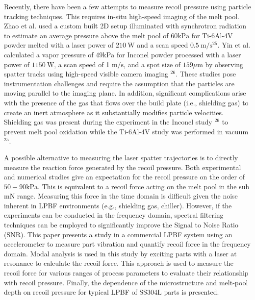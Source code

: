 \documentclass[10pt]{article}
\begin{document}
Recently, there have been a few attempts to measure recoil pressure using particle tracking techniques. This requires in-situ high-speed imaging of the melt pool. Zhao et al. used a custom built 2D setup illuminated with synchrotron radiation to estimate an average pressure above the melt pool of $60 \mathrm{kPa}$ for Ti-6Al-4V powder melted with a laser power of $210 \mathrm{~W}$ and a scan speed $0.5 \mathrm{~m} / \mathrm{s}^{25}$. Yin et al. calculated a vapor pressure of $49 \mathrm{kPa}$ for Inconel powder processed with a laser power of $1150 \mathrm{~W}$, a scan speed of 1 $\mathrm{m} / \mathrm{s}$, and a spot size of $159 \mu \mathrm{m}$ by observing spatter tracks using high-speed visible camera imaging ${ }^{26}$. These studies pose instrumentation challenges and require the assumption that the particles are moving parallel to the imaging plane. In addition, significant complications arise with the presence of the gas that flows over the build plate (i.e., shielding gas) to create an inert atmosphere as it substantially modifies particle velocities. Shielding gas was present during the experiment in the Inconel study ${ }^{26}$ to prevent melt pool oxidation while the Ti-6Al-4V study was performed in vacuum ${ }^{25}$.

A possible alternative to measuring the laser spatter trajectories is to directly measure the reaction force generated by the recoil pressure. Both experimental and numerical studies give an expectation for the recoil pressure on the order of $50-90 \mathrm{kPa}$. This is equivalent to a recoil force acting on the melt pool in the sub $\mathrm{mN}$ range. Measuring this force in the time domain is difficult given the noise inherent in LPBF environments (e.g., shielding gas, chiller). However, if the experiments can be conducted in the frequency domain, spectral filtering techniques can be employed to significantly improve the Signal to Noise Ratio (SNR). This paper presents a study in a commercial LPBF system using an accelerometer to measure part vibration and quantify recoil force in the frequency domain. Modal analysis is used in this study by exciting parts with a laser at resonance to calculate the recoil force. This approach is used to measure the recoil force for various ranges of process parameters to evaluate their relationship with recoil pressure. Finally, the dependence of the microstructure and melt-pool depth on recoil pressure for typical LPBF of SS304L parts is presented.
\end{document}
